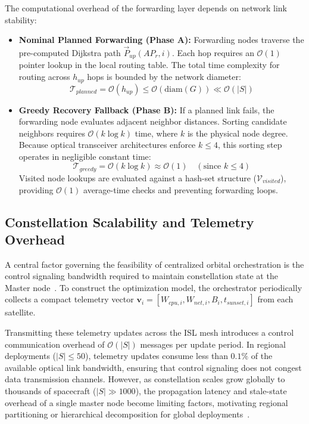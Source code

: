 The computational overhead of the forwarding layer depends on network link stability:
\begin{itemize}
    \item \textbf{Nominal Planned Forwarding (Phase A):} Forwarding nodes traverse the pre-computed Dijkstra path $\vec{P}_{up}(AP_r, i)$. Each hop requires an $\mathcal{O}(1)$ pointer lookup in the local routing table. The total time complexity for routing across $h_{up}$ hops is bounded by the network diameter:
    \begin{equation}
        \mathcal{T}_{planned} = \mathcal{O}(h_{up}) \le \mathcal{O}(\text{diam}(G)) \ll \mathcal{O}(|S|)
    \end{equation}
    \item \textbf{Greedy Recovery Fallback (Phase B):} If a planned link fails, the forwarding node evaluates adjacent neighbor distances. Sorting candidate neighbors requires $\mathcal{O}(k \log k)$ time, where $k$ is the physical node degree. Because optical transceiver architectures enforce $k \le 4$, this sorting step operates in negligible constant time:
    \begin{equation}
        \mathcal{T}_{greedy} = \mathcal{O}(k \log k) \approx \mathcal{O}(1) \quad (\text{since } k \le 4)
    \end{equation}
    Visited node lookups are evaluated against a hash-set structure ($\mathcal{V}_{visited}$), providing $\mathcal{O}(1)$ average-time checks and preventing forwarding loops.
\end{itemize}

\subsection{Constellation Scalability and Telemetry Overhead}
\label{subsec:complexity_scalability}

A central factor governing the feasibility of centralized orbital orchestration is the control signaling bandwidth required to maintain constellation state at the Master node~\cite{survey_orbital_edge_2023, icdcs_satellite_2025}. 
To construct the optimization model, the orchestrator periodically collects a compact telemetry vector $\mathbf{v}_i = [W_{cpu,i}, W_{net,i}, B_i, t_{sunset,i}]$ from each satellite.

Transmitting these telemetry updates across the ISL mesh introduces a control communication overhead of $\mathcal{O}(|S|)$ messages per update period. 
In regional deployments ($|S| \le 50$), telemetry updates consume less than $0.1\%$ of the available optical link bandwidth, ensuring that control signaling does not congest data transmission channels. 
However, as constellation scales grow globally to thousands of spacecraft ($|S| \gg 1000$), the propagation latency and stale-state overhead of a single master node become limiting factors, motivating regional partitioning or hierarchical decomposition for global deployments~\cite{icdcs_satellite_2025}.